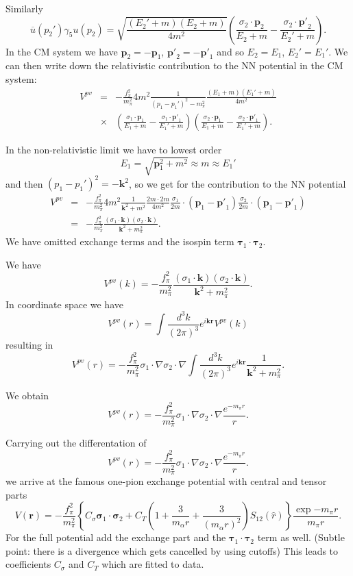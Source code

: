 \documentclass[graybox,sectrefs,envcountresetchap,open=right]{svmonodo}
\begin{document}
Similarly
\[
\overline{u}(p_{2}')\gamma_{5}u(p_{2})=\sqrt{\frac{(E_{2}'+m)(E_{2}+m)}
{4m^{2}}}\left(\frac{\sigma_{2}\cdot \mathbf{p}_{2}}{E_{2}+m}-
\frac{\sigma_{2}\cdot\mathbf{p'}_{2}}{E_{2}'+m}\right).
\]
In the CM system we have $\mathbf{p}_{2}=-\mathbf{p}_{1}$, $\mathbf{p'}_{2}=
-\mathbf{p'}_{1}$ and so $E_{2}=E_{1}$, $E_{2}'=E_{1}'$.  
We can then write down the relativistic contribution 
to the NN potential in the CM system: 
\begin{eqnarray}
V^{pv}&=&-\frac{f_{\pi}^{2}}{m_{\pi}^{2}}4m^{2}\frac{1}{(p_{1}-p_{1}')^{2}-
m_{\pi}^{2}}\frac{(E_{1}+m)(E_{1}'+m)}{4m^{2}} \nonumber \\ 
 &\times&\left(\frac{\sigma_{1}\cdot\mathbf{p}_{1}}{E_{1}+m}-\frac{\sigma_{1}
\cdot\mathbf{p'}_{1}}{E_{1}'+m}\right)\left(\frac{\sigma_{2}\cdot\mathbf{p}_{1}}
{E_{1}+m}-\frac{\sigma_{2}\cdot\mathbf{p'}_{1}}{E_{1}'+m}\right). \nonumber
\end{eqnarray}


In the non-relativistic limit we have to lowest order 
\[
E_{1}=\sqrt{\mathbf{p}_{1}^{2}+m^{2}}\approx m \approx E_{1}'
\]
and then $(p_{1}-p_{1}')^{2}=-\mathbf{k}^{2}$, so we get 
for the contribution to the NN potential
\begin{eqnarray}
V^{pv}&=&-\frac{f_{\pi}^{2}}{m_{\pi}^{2}}4m^{2}\frac{1}{\mathbf{k}^{2}+m^{2}}
\frac{2m\cdot 2m}{4m^{2}}\frac{\sigma_{1}}{2m}\cdot(\mathbf{p}_{1}-\mathbf{p'}_{1})
\frac{\sigma_{2}}{2m}\cdot (\mathbf{p}_{1}-\mathbf{p'}_{1}) \nonumber \\ 
 &=&-\frac{f_{\pi}^{2}}{m_{\pi}^{2}}
\frac{(\sigma_{1}\cdot\mathbf{k})(\sigma_{2}\cdot\mathbf{k})}{\mathbf{k}^{2}+m_{\pi}^{2}}.
\nonumber
\end{eqnarray}
We have omitted exchange terms and the isospin term $\mathbf{\tau}_1\cdot\mathbf{\tau}_2$.


We have
\[
V^{pv}(k)=-\frac{f_{\pi}^{2}}{m_{\pi}^{2}}
\frac{(\sigma_{1}\cdot\mathbf{k})(\sigma_{2}\cdot\mathbf{k})}{\mathbf{k}^{2}+m_{\pi}^{2}}.
\]
In coordinate space we have
\[
V^{pv}(r)=\int\frac{d^3k}{(2\pi)^3}e^{i\mathbf{kr}}V^{pv}(k)
\]
resulting in
\[
  V^{pv}(r)=-\frac{f_{\pi}^{2}}{m_{\pi}^{2}}
\sigma_{1}\cdot{\nabla}\sigma_{2}\cdot{\nabla}
\int\frac{d^3k}{(2\pi)^3}e^{i\mathbf{kr}}\frac{1}{\mathbf{k}^{2}+m_{\pi}^{2}}.
\]


We obtain
\[
V^{pv}(r)=-\frac{f_{\pi}^{2}}{m_{\pi}^{2}}\sigma_{1}\cdot{\nabla}\sigma_{2}\cdot{\nabla}\frac{e^{-m_{\pi}r}}{r}.
\]

Carrying out the differentation of
\[
V^{pv}(r)=-\frac{f_{\pi}^{2}}{m_{\pi}^{2}}\sigma_{1}\cdot{\nabla}\sigma_{2}\cdot{\nabla}\frac{e^{-m_{\pi}r}}{r}.
\]
we arrive at the famous one-pion exchange potential with central and tensor parts
\[
V(\mathbf{r})= -\frac{f_{\pi}^{2}}{m_{\pi}^{2}}\left\{C_{\sigma}\mathbf{\sigma}_1\cdot\mathbf{\sigma}_2+ C_T \left( 1 + \frac{3}{m_\alpha r} + \frac{3}{\left(m_\alpha r\right)^2}\right) S_{12}(\hat r)\right\}\frac{\exp{-m_\pi r}}{m_\pi r}.
\]
For the full potential add the exchange part and the $\mathbf{\tau}_1\cdot\mathbf{\tau}_2$ term as well. (Subtle point: there is a divergence which gets cancelled by using cutoffs) This leads to coefficients $C_{\sigma}$ and $C_T$ which are fitted to data.
\end{document}
